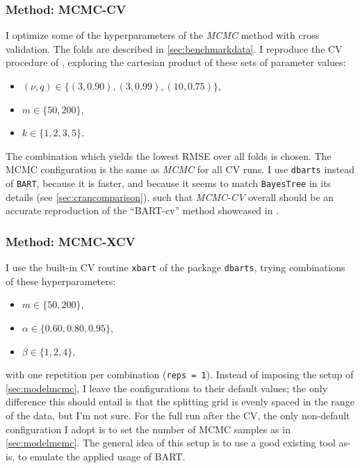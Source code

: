 \documentclass[a4paper]{article}
\theoremstyle{definition}
\let\oldmarginpar\marginpar
\renewcommand{\marginpar}[1]{\oldmarginpar{\sffamily\scriptsize #1}}
\renewcommand{\marginpar}[1]{\relax} %
\begin{document}
    \subsubsection{Method: MCMC-CV}
    \label{sec:modelmcmccv}

    I optimize some of the hyperparameters of the \emph{MCMC} method with cross validation. The folds are described in \autoref{sec:benchmarkdata}. I reproduce the CV procedure of \textcite{chipman2010}, exploring the cartesian product of these sets of parameter values:
    \begin{itemize}
        \item $(\nu,q) \in \{(3, 0.90), (3, 0.99), (10, 0.75)\}$,
        \item $m \in \{50, 200\}$,
        \item $k \in \{1, 2, 3, 5\}$.
    \end{itemize}
    The combination which yields the lowest RMSE over all folds is chosen. The MCMC configuration is the same as \emph{MCMC} for all CV runs. I use \texttt{dbarts} instead of \texttt{BART}, because it is faster, and because it seems to match \texttt{BayesTree} in its details (see \autoref{sec:crancomparison}), such that \emph{MCMC-CV} overall should be an accurate reproduction of the ``BART-cv'' method showcased in \textcite{chipman2010}.

    \subsubsection{Method: MCMC-XCV}
    \label{sec:modelmcmcxcv}

    I use the built-in CV routine \texttt{xbart} of the package \texttt{dbarts}, trying combinations of these hyperparameters:
    \begin{itemize}
        \item $m \in \{50, 200\}$,
        \item $\alpha \in \{0.60, 0.80, 0.95\}$,
        \item $\beta \in \{1, 2, 4\}$,
    \end{itemize}
    with one repetition per combination (\texttt{reps = 1}).\marginpar{Maybe I should use the default \texttt{n.reps = 40}. It would be as slow as \emph{MCMC-CV}, but there could be a reason it is set so high. Also it would adhere better to the goal of using a method as-is.} Instead of imposing the setup of \autoref{sec:modelmcmc}, I leave the configurations to their default values; the only difference this should entail is that the splitting grid is evenly spaced in the range of the data, but I'm not sure. For the full run after the CV, the only non-default configuration I adopt is to set the number of MCMC samples as in \autoref{sec:modelmcmc}. The general idea of this setup is to use a good existing tool as-is, to emulate the applied usage of BART.
\end{document}
